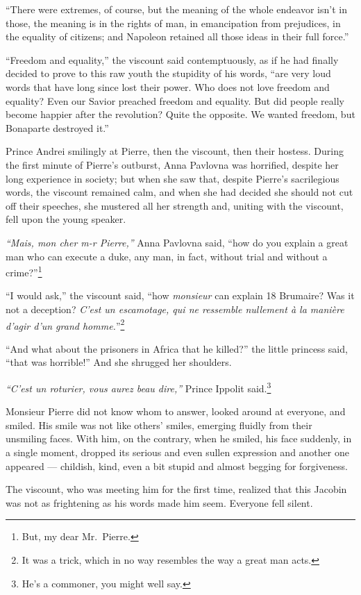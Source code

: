 ``There were extremes, of course, but the meaning of the whole
endeavor isn't in those, the meaning is in the rights of man, in
emancipation from prejudices, in the equality of citizens; and
Napoleon retained all those ideas in their full force.''

``Freedom and equality,'' the viscount said contemptuously, as if he
had finally decided to prove to this raw youth the stupidity of his
words, ``are very loud words that have long since lost their
power. Who does not love freedom and equality? Even our Savior
preached freedom and equality. But did people really become happier
after the revolution? Quite the opposite. We wanted freedom, but
Bonaparte destroyed it.''

Prince Andrei smilingly at Pierre, then the viscount, then their
hostess. During the first minute of Pierre's outburst, Anna Pavlovna
was horrified, despite her long experience in society; but when she
saw that, despite Pierre's sacrilegious words, the viscount remained
calm, and when she had decided she should not cut off their speeches,
she mustered all her strength and, uniting with the viscount, fell
upon the young speaker.

\textit{``Mais, mon cher m-r Pierre,''} Anna Pavlovna said, ``how do
you explain a great man who can execute a duke, any man, in fact,
without trial and without a crime?''\footnote{But, my dear Mr.~Pierre.}

``I would ask,'' the viscount said, ``how \textit{monsieur} can
explain 18 Brumaire? Was it not a deception? \textit{C'est un
  escamotage, qui ne ressemble nullement \`a la mani\`ere d'agir d'un
  grand homme.}''\footnote{It was a trick, which in no way resembles
  the way a great man acts.}

``And what about the prisoners in Africa that he killed?'' the little
princess said, ``that was horrible!'' And she shrugged her shoulders.

\textit{``C'est un roturier, vous aurez beau dire,''} Prince Ippolit
said.\footnote{He's a commoner, you might well say.}

Monsieur Pierre did not know whom to answer, looked around at
everyone, and smiled. His smile was not like others' smiles, emerging
fluidly from their unsmiling faces. With him, on the contrary, when he
smiled, his face suddenly, in a single moment, dropped its serious and
even sullen expression and another one appeared --- childish, kind,
even a bit stupid and almost begging for forgiveness.

The viscount, who was meeting him for the first time, realized that
this Jacobin was not as frightening as his words made him
seem. Everyone fell silent.

